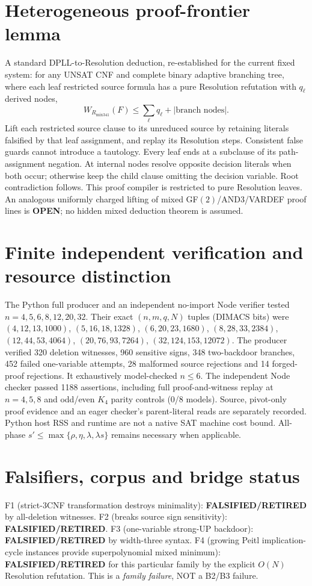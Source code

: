 \documentclass[11pt]{article}
\begin{document}
\section*{Heterogeneous proof-frontier lemma}
A standard DPLL-to-Resolution deduction, re-established for the current fixed system: for any UNSAT CNF and complete binary adaptive branching tree, where each leaf restricted source formula has a pure Resolution refutation with $q_\ell$ derived nodes,
\[
W_{R_{\mathrm{mix341}}}(F)\le \sum_{\ell}q_\ell + |\text{branch nodes}|.
\]
Lift each restricted source clause to its unreduced source by retaining literals falsified by that leaf assignment, and replay its Resolution steps. Consistent false guards cannot introduce a tautology. Every leaf ends at a subclause of its path-assignment negation. At internal nodes resolve opposite decision literals when both occur; otherwise keep the child clause omitting the decision variable. Root contradiction follows. This proof compiler is restricted to pure Resolution leaves. An analogous uniformly charged lifting of mixed GF$(2)$/AND3/VARDEF proof lines is \textbf{OPEN}; no hidden mixed deduction theorem is assumed.

\section*{Finite independent verification and resource distinction}
The Python full producer and an independent no-import Node verifier tested $n=4,5,6,8,12,20,32$. Their exact $(n,m,q,N)$ tuples (DIMACS bits) were $(4,12,13,1000)$, $(5,16,18,1328)$, $(6,20,23,1680)$, $(8,28,33,2384)$, $(12,44,53,4064)$, $(20,76,93,7264)$, $(32,124,153,12072)$. The producer verified 320 deletion witnesses, 960 sensitive signs, 348 two-backdoor branches, 452 failed one-variable attempts, 28 malformed source rejections and 14 forged-proof rejections. It exhaustively model-checked $n\le6$. The independent Node checker passed 1188 assertions, including full proof-and-witness replay at $n=4,5,8$ and odd/even $K_4$ parity controls (0/8 models). Source, pivot-only proof evidence and an eager checker's parent-literal reads are separately recorded. Python host RSS and runtime are not a native SAT machine cost bound. All-phase $s'\le\max\{\rho,\eta,\lambda,\lambda s\}$ remains necessary when applicable.

\section*{Falsifiers, corpus and bridge status}
F1 (strict-3CNF transformation destroys minimality): \textbf{FALSIFIED/RETIRED} by all-deletion witnesses. F2 (breaks source sign sensitivity): \textbf{FALSIFIED/RETIRED}. F3 (one-variable strong-UP backdoor): \textbf{FALSIFIED/RETIRED} by width-three syntax. F4 (growing Peitl implication-cycle instances provide superpolynomial mixed minimum): \textbf{FALSIFIED/RETIRED} for this particular family by the explicit $O(N)$ Resolution refutation. This is a \emph{family failure}, NOT a B2/B3 failure.
\end{document}
